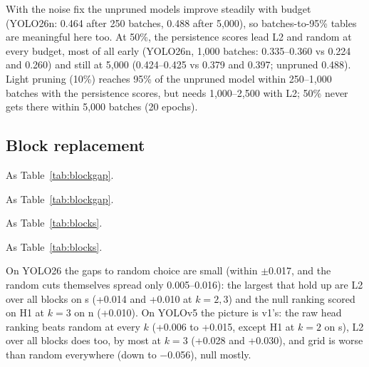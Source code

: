\documentclass[10pt]{article}
\newcommand{\tnote}[1]{\par\vspace{3pt}\begin{minipage}{\linewidth}\footnotesize #1\end{minipage}}  %
\newcommand{\tbl}[1]{\adjustbox{max width=\linewidth}{}}
\begin{document}
With the noise fix the unpruned models improve steadily with budget (YOLO26n: 0.464 after 250
batches, 0.488 after 5,000), so batches-to-95\% tables are meaningful here too. At 50\%, the
persistence scores lead L2 and random at every budget, most of all early (YOLO26n, 1,000 batches:
0.335--0.360 vs 0.224 and 0.260) and still at 5,000 (0.424--0.425 vs 0.379 and 0.397; unpruned 0.488).
Light pruning (10\%) reaches 95\% of the unpruned model within 250--1,000 batches with the persistence
scores, but needs 1,000--2,500 with L2; 50\% never gets there within 5,000 batches (20 epochs).

\subsection{Block replacement}

\begin{table}[H]
\centering\small
\caption{Viewsphere v2 block pruning: TDA-chosen blocks vs randomly chosen blocks, YOLO26}
\tbl{block_gap_vs2}
\tnote{As Table~\ref{tab:blockgap}.}
\end{table}

\begin{table}[H]
\centering\small
\caption{Viewsphere v2 block pruning: TDA-chosen blocks vs randomly chosen blocks, YOLOv5}
\tbl{block_gap_v5_vs2}
\tnote{As Table~\ref{tab:blockgap}.}
\end{table}

\begin{table}[H]
\centering\small
\caption{Viewsphere v2 block pruning: accuracy of each ranking's cut, YOLO26}
\tbl{blocks_vs2}
\tnote{As Table~\ref{tab:blocks}.}
\end{table}

\begin{table}[H]
\centering\small
\caption{Viewsphere v2 block pruning: accuracy of each ranking's cut, YOLOv5}
\tbl{blocks_v5_vs2}
\tnote{As Table~\ref{tab:blocks}.}
\end{table}

On YOLO26 the gaps to random choice are small (within $\pm$0.017, and the random cuts themselves
spread only 0.005--0.016): the largest that hold up are L2 over all blocks on s (+0.014 and +0.010 at
$k = 2, 3$) and the null ranking scored on H1 at $k = 3$ on n (+0.010). On YOLOv5 the picture is v1's:
the raw head ranking beats random at every $k$ (+0.006 to +0.015, except H1 at $k = 2$ on s), L2 over
all blocks does too, by most at $k = 3$ (+0.028 and +0.030), and grid is worse than random everywhere
(down to $-$0.056), null mostly.
\end{document}
